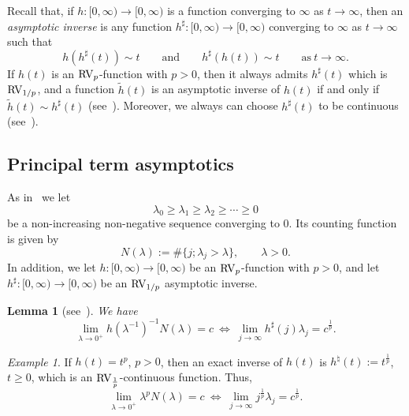 \documentclass[10pt, a4paper]{amsart}
\numberwithin{equation}{section}
\newtheorem{lemma}[theorem]{Lemma}
\theoremstyle{definition}
\theoremstyle{remark}
\newtheorem{example}[theorem]{Example}
\newcommand{\RV}{\textup{RV}}
\begin{document}
Recall that, if $h:[0,\infty)\rightarrow [0,\infty)$ is a function converging to $\infty$ as $t\rightarrow \infty$, then an \emph{asymptotic inverse} is any function
$h^\sharp:[0,\infty)\rightarrow [0,\infty)$ converging to $\infty$ as $t\rightarrow \infty$ such that
 \begin{equation*}
 h(h^\sharp(t)) \sim t \qquad \text{and} \qquad h^\sharp(h(t)) \sim t  \qquad \text{as}\ t\rightarrow \infty.
 \end{equation*}
If $h(t)$ is an $\RV_p$-function with $p>0$, then it always admits $h^\sharp(t)$ which is $\RV_{1/p}$, and a function $\tilde{h}(t)$ is an asymptotic inverse of $h(t)$ if and only if $\tilde{h}(t)\sim h^\sharp(t)$ (see~\cite[Theorem~5.1.12]{BGT:Cambridge87}). Moreover, we always can choose $h^\sharp(t)$ to be continuous (see~\cite[Remark~B.2]{PT:Part1}). 

\subsection{Principal term asymptotics}
As in~\cite[Appendix~B]{PT:Part1} we let
\begin{equation*}
 \lambda_0\geq \lambda_1 \geq \lambda_2 \geq \cdots \geq 0
\end{equation*}
be a non-increasing non-negative sequence converging to $0$. Its counting function is given by
\begin{equation*}
 N(\lambda):= \#\{j; \lambda_j>\lambda\}, \qquad \lambda>0.
\end{equation*}
In addition, we let $h:[0,\infty)\rightarrow [0,\infty)$ be an $\RV_p$-function with $p>0$, and let $h^\sharp: [0,\infty)\rightarrow [0,\infty)$ be an
$\RV_{1/p}$ asymptotic inverse.

\begin{lemma}[see~\cite{PT:Part1}]\label{lem:app.principal-equiv}
We have
\begin{equation}\label{eq:asymptotic equivalence}
 \lim_{\lambda\rightarrow 0^+} h(\lambda^{-1})^{-1}N(\lambda)=c \ \Longleftrightarrow \ \lim_{j\rightarrow \infty} h^\sharp(j)\lambda_j =c^{\frac1p}.
\end{equation}
\end{lemma}

\begin{example}
 If $h(t)=t^p$, $p>0$, then an exact inverse of $h(t)$ is $h^\natural(t):=t^{\frac1p}$, $t\geq 0$, which is an $\RV_{\frac1p}$-continuous function. Thus, 
 \begin{equation*}
 \lim_{\lambda\rightarrow 0^+} \lambda^pN(\lambda)=c \ \Longleftrightarrow \ \lim_{j\rightarrow \infty} j^{\frac1p}\lambda_j =c^{\frac1p}.
\end{equation*}
\end{example}
\end{document}
